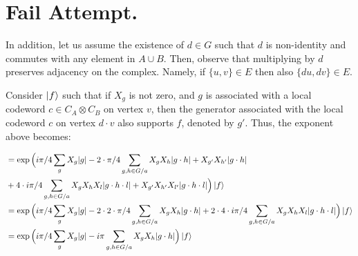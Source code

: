 \documentclass[manuscript,screen,review]{acmart}
\begin{document}
%
%


\section{Fail Attempt.}


In addition, let us assume the existence of $d \in G$ such that $d$ is non-identity and commutes with any element in $A \cup B$. Then, observe that multiplying by $d$ preserves adjacency on the complex. Namely, if $\{u,v\} \in E$ then also $\{du, dv\} \in E$. 

Consider $\ket{f}$ such that if $X_g$ is not zero, and $g$ is associated with a local codeword $c \in C_A \otimes C_B$ on vertex $v$, then the generator associated with the local codeword $c$ on vertex $d \cdot v$ also supports $f$, denoted by $g'$. Thus, the exponent above becomes:

\begin{equation*}
  \begin{split}
    & = \exp \Big( i\pi/4 \sum_{g} X_{g}|g|  -  2 \cdot \pi/4 \sum_{g,h \in G /a} X_{g}X_{h}|g\cdot h| + X_{g^{\prime}}X_{h^{\prime}}|g\cdot h |  \\
    & +  4 \cdot i\pi/4 \sum_{g,h \in G/a} X_{g}X_{h}X_{l}|g\cdot h \cdot l| + X_{g^{\prime}}X_{h^{\prime}}X_{l^{\prime}}|g\cdot h \cdot l| \Big) \ket{f} \\
    & = \exp \Big( i\pi/4 \sum_{g} X_{g}|g|  -  2 \cdot 2 \cdot \pi/4 \sum_{g,h \in G/a} X_{g}X_{h}|g\cdot h| +  2 \cdot 4 \cdot i\pi/4 \sum_{g,h \in G/a} X_{g}X_{h}X_{l}|g\cdot h \cdot l| \Big) \ket{f} \\
    & = \exp \Big( i\pi/4 \sum_{g} X_{g}|g|  -  i\pi \sum_{g,h \in G/a} X_{g}X_{h}|g\cdot h|  \Big) \ket{f} 
  \end{split}
\end{equation*}
\end{document}
